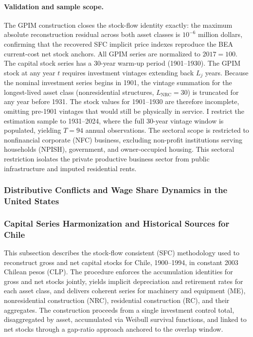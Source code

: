 \paragraph{Validation and sample scope.}
The GPIM construction closes the stock-flow identity exactly: the
maximum absolute reconstruction residual across both asset classes
is $10^{-6}$ million dollars, confirming that the recovered SFC
implicit price indexes reproduce the BEA current-cost net stock
anchors. All GPIM series are normalized to $2017 = 100$.
The capital stock series has a 30-year warm-up period (1901--1930).
The GPIM stock at any year $t$ requires investment vintages
extending back $L_j$ years. Because the nominal investment series
begins in 1901, the vintage summation for the longest-lived asset
class (nonresidential structures, $L_{\text{NRC}} = 30$) is
truncated for any year before 1931. The stock values for
1901--1930 are therefore incomplete, omitting pre-1901 vintages
that would still be physically in service. I restrict the
estimation sample to 1931--2024, where the full 30-year vintage
window is populated, yielding $T = 94$ annual observations.
The sectoral scope is restricted to nonfinancial corporate (NFC)
business, excluding non-profit institutions serving households
(NPISH), government, and owner-occupied housing. This sectoral
restriction isolates the private productive business sector from
public infrastructure and imputed residential rents.

\subsubsection{Distributive Conflicts and Wage Share Dynamics in the United States}


\subsubsection{Capital Series Harmonization and Historical Sources for Chile}
\label{sec:413:chile_sfc}

This subsection describes the stock-flow consistent (SFC) methodology
used to reconstruct gross and net capital stocks for Chile,
1900--1994, in constant 2003 Chilean pesos (CLP). The procedure
enforces the accumulation identities for gross and net stocks
jointly, yields implicit depreciation and retirement rates for each
asset class, and delivers coherent series for machinery and equipment
(ME), nonresidential construction (NRC), residential construction
(RC), and their aggregates. The construction proceeds from a single
investment control total, disaggregated by asset, accumulated via
Weibull survival functions, and linked to net stocks through a
gap-ratio approach anchored to the \citet{Hofman2000b} overlap
window.

